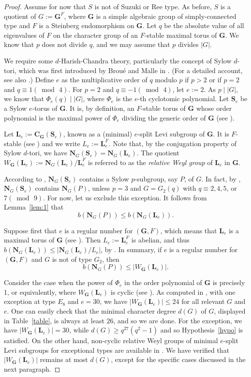 \documentclass[12pt]{amsart}
\theoremstyle{plain}
\theoremstyle{definition}
\numberwithin{equation}{section}
\newcommand{\bG}{\mathbf{G}}
\newcommand{\bL}{\mathbf{L}}
\newcommand{\bN}{\mathbf{N}}
\newcommand{\bC}{{\mathbf{C}}}
\newcommand{\bS}{{\mathbf{S}}}
\begin{document}
\begin{proof}
Assume for now that $S$ is not of Suzuki or Ree type. As before, $S$
is a quotient of $G:=\bG^F$, where $\bG$ is a simple algebraic group
of simply-connected type and $F$ is a Steinberg endomorphism on
$\bG$. Let $q$ be the absolute value of all eigenvalues of $F$ on
the character group of an $F$-stable maximal torus of $\bG$. We know
that $p$ does not divide $q$, and we may assume that $p$ divides
$|G|$.

We require some $d$-Harish-Chandra theory, particularly the concept
of Sylow $d$-tori, which was first introduced by Brou\'{e} and Malle
in \cite{BM92}. (For a detailed account, see also
\cite[\S3.5]{GM20}.) Define $e$ as the multiplicative order of $q$
modulo $p$ if $p>2$ or if $p=2$ and $q\equiv 1(\bmod\,4)$. For $p=2$
and $q\equiv -1(\bmod\,4)$, let $e:=2$. As $p\mid |G|$, we know that
$\Phi_e(q) \mid |G|$, where $\Phi_e$ is the $e$-th cyclotomic
polynomial. Let $\bS_e$ be a Sylow $e$-torus of $\bG$. It is, by
definition, an $F$-stable torus of $\bG$ whose order polynomial is
the maximal power of $\Phi_e$ dividing the generic order of $\bG$
(see \cite[p.~259]{GM20}).

Let $\bL_e:=\bC_\bG(\bS_e)$, known as a (minimal) $e$-split Levi
subgroup of $\bG$. It is $F$-stable (see \cite[p.~258]{GM20}) and we
write $L_e:=\bL_e^F$. Note that, by the conjugation property of
Sylow $d$-tori, we have $\bN_G(\bS_e)=\bN_G(\bL_e)$. The quotient
$W_\bG(\bL_e):=\bN_G(\bL_e)/\bL_e^F$ is referred to as the
\emph{relative Weyl group} of $\bL_e$ in $\bG$.


According to \cite[Proposition~5.21]{Malle07}, $\bN_G(\bS_e)$
contains a Sylow $p$-subgroup, say $P$, of $G$. In fact, by
\cite[Theorem~7.8]{Malle07}, $\bN_G(\bS_e)$ contains $\bN_G(P)$,
unless $p=3$ and $G = G_2(q)$ with $q\equiv2, 4, 5$, or $7
(\bmod\,9)$. For now, let us exclude this exception. It follows from
Lemma~\ref{lem:1} that
\[b(\bN_G(P))\leq b(\bN_G(\bL_e)).\]


Suppose first that $e$ is a regular number for $(\bG,F)$, which
means that $\bL_e$ is a maximal torus of $\bG$ (see
\cite[p.~259]{GM20}). Then $L_e:=\bL_e^F$ is abelian, and thus
$b(\bN_G(\bL_e))\leq |\bN_G(\bL_e)/L_e|$, by
\cite[Corollary~11.29]{Is}. In summary, if $e$ is a regular number
for $(\bG,F)$ and $G$ is not of type $G_2$, then
\[
b(\bN_G(P))\leq |W_\bG(\bL_e)|.
\]

Consider the case when the power of $\Phi_e$ in the order polynomial
of $\bG$ is precisely 1, or equivalently, where $W_\bG(\bL_e)$ is
cyclic (see \cite[Proposition~3.5.12]{GM20}). As computed in
\cite[Table~8.1]{BM93}, with one exception at type $E_8$ and $e=30$,
we have $|W_\bG(\bL_e)|\leq 24$ for all relevant $G$ and $e$. One
can easily check that the minimal character degree $d(G)$ of $G$,
displayed in Table~\ref{table}, is always at least $26$, and so we
are done. For the exception, we have $|W_\bG(\bL_e)|=30$, while
$d(G)\geq q^{27}(q^2-1)$ and so Hypothesis~\ref{hypo} is satisfied.
On the other hand, non-cyclic relative Weyl groups of minimal
$e$-split Levi subgroups for exceptional types are available in
\cite[Table~3.2]{GM20}. We have verified that $|W_\bG(\bL_e)|$
remains at most $d(G)$, except for the specific cases discussed in
the next paragraph.


\end{proof}
\end{document}
